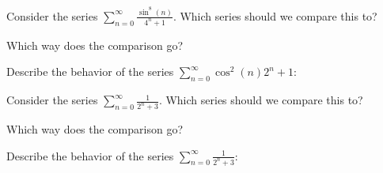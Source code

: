 \documentclass{ximera}
\begin{document}
\begin{problem}
Consider the series $\sum_{n=0}^\infty \frac{\sin^8(n)}{4^n + 1}$.
Which series should we compare this to?

\begin{multipleChoice}
\end{multipleChoice}

Which way does the comparison go?
\begin{multipleChoice}
\end{multipleChoice}

Describe the behavior of the series $\sum_{n=0}^\infty {\cos^2(n)}{2^n + 1}:$
\begin{multipleChoice}
\end{multipleChoice}

\end{problem}




\begin{problem}
Consider the series $\sum_{n=0}^\infty \frac{1}{2^n + 3}$.
Which series should we compare this to?

\begin{multipleChoice}
\end{multipleChoice}

Which way does the comparison go?
\begin{multipleChoice}
\end{multipleChoice}

Describe the behavior of the series $\sum_{n=0}^\infty \frac{1}{2^n + 3}:$
\begin{multipleChoice}
\end{multipleChoice}

\end{problem}
\end{document}
